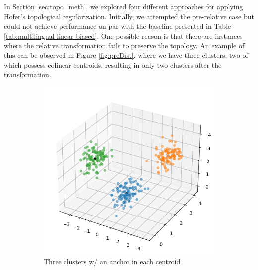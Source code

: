 \documentclass[../main.tex]{subfiles}
\begin{document}
In Section \ref{sec:topo_meth}, we explored four different approaches for applying Hofer's topological regularization. Initially, we attempted the pre-relative case but could not achieve performance on par with the baseline presented in Table \ref{tab:multilingual-linear-biased}. One possible reason is that there are instances where the relative transformation fails to preserve the topology. An example of this can be observed in Figure \ref{fig:preDist}, where we have three clusters, two of which possess colinear centroids, resulting in only two clusters after the transformation.


\begin{figure}[ht!]
     \centering
    \begin{subfigure}[b]{0.45\textwidth}
         \centering
         \includegraphics[width=\textwidth]{figures/rs/clusters_1.png}
        \caption{Three clusters w/ an anchor in each centroid}
         \label{fig:rel_ex_1}
     \end{subfigure}\hfill
      \begin{subfigure}[b]{0.45\textwidth}
         \centering

\end{subfigure}
\end{figure}
\end{document}
